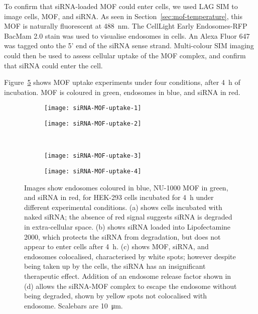 To confirm that siRNA-loaded MOF could enter cells, we used LAG SIM to image cells, MOF, and siRNA. 
As seen in Section~\ref{sec:mof-temperature}, this MOF is naturally fluorescent at \SI{488}{\nano\metre}. 
The CellLight Early Endosomes-RFP BacMam 2.0 stain was used to visualise endosomes in cells. 
An Alexa Fluor 647 was tagged onto the 5' end of the siRNA sense strand. 
Multi-colour SIM imaging could then be used to assess cellular uptake of the MOF complex, and confirm that siRNA could enter the cell. 

Figure~\ref{fig:siRNA-MOF-uptake} shows MOF uptake experiments under four conditions, after \SI{4}{\hour} of incubation. 
MOF is coloured in green, endosomes in blue, and siRNA in red. 


\begin{figure}[tbp]
\centering
\begin{subfigure}[b]{0.49\textwidth}
	\texttt{[image: siRNA-MOF-uptake-1]}
	\caption{}\label{fig:siRNA-MOF-uptake-1}
\end{subfigure}
\hfill
\begin{subfigure}[b]{0.49\textwidth}
	\texttt{[image: siRNA-MOF-uptake-2]}
	\caption{}\label{fig:siRNA-MOF-uptake-2}
\end{subfigure}

~\newline
\begin{subfigure}[b]{0.49\textwidth}
	\texttt{[image: siRNA-MOF-uptake-3]}
	\caption{}\label{fig:siRNA-MOF-uptake-3}
\end{subfigure}
\hfill
\begin{subfigure}[b]{0.49\textwidth}
	\texttt{[image: siRNA-MOF-uptake-4]}
	\caption{}\label{fig:siRNA-MOF-uptake-4}
\end{subfigure}
\caption[MOFs: siRNA-loaded NU-1000 is endocytosed by HEK-293 cells, and released to the cytoplasm with an endosome release factor]{Images show endosomes coloured in blue, NU-1000 MOF in green, and siRNA in red, for HEK-293 cells incubated for \SI{4}{\hour} under different experimental conditions. (a) shows cells incubated with naked siRNA; the absence of red signal suggests siRNA is degraded in extra-cellular space. (b) shows siRNA loaded into Lipofectamine 2000, which protects the siRNA from degradation, but does not appear to enter cells after \SI{4}{\hour}. (c) shows MOF, siRNA, and endosomes colocalised, characterised by white spots; however despite being taken up by the cells, the siRNA has an insignificant therapeutic effect. Addition of an endosome release factor shown in (d) allows the siRNA-MOF complex to escape the endosome without being degraded, shown by yellow spots not colocalised with endosome. Scalebars are \SI{10}{\micro\metre}. }
\label{fig:siRNA-MOF-uptake}
\end{figure}

